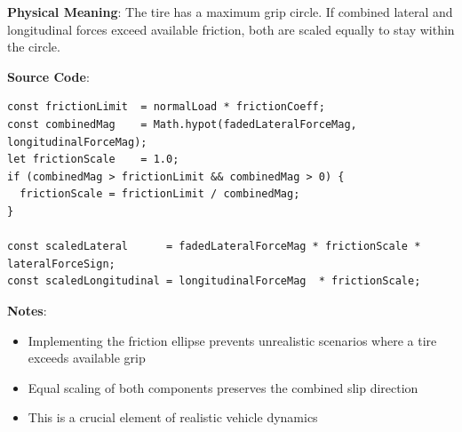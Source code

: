 \textbf{Physical Meaning}: The tire has a maximum grip circle. If combined lateral and longitudinal forces exceed available friction, both are scaled equally to stay within the circle.

\textbf{Source Code}: 

\begin{lstlisting}[caption={Friction ellipse limiting}]
const frictionLimit  = normalLoad * frictionCoeff;
const combinedMag    = Math.hypot(fadedLateralForceMag, longitudinalForceMag);
let frictionScale    = 1.0;
if (combinedMag > frictionLimit && combinedMag > 0) {
  frictionScale = frictionLimit / combinedMag;
}

const scaledLateral      = fadedLateralForceMag * frictionScale * lateralForceSign;
const scaledLongitudinal = longitudinalForceMag  * frictionScale;
\end{lstlisting}

\textbf{Notes}:
\begin{itemize}
  \item Implementing the friction ellipse prevents unrealistic scenarios where a tire exceeds available grip
  \item Equal scaling of both components preserves the combined slip direction
  \item This is a crucial element of realistic vehicle dynamics
\end{itemize}

\newpage
